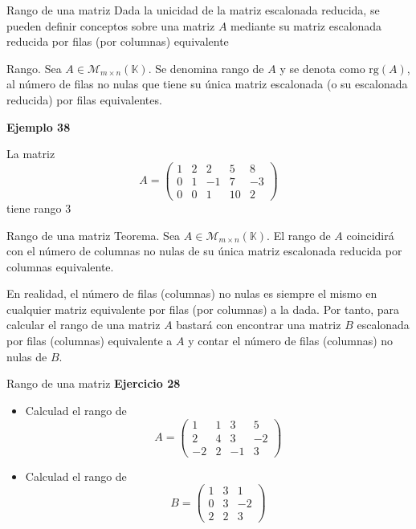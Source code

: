 \documentclass[
  ignorenonframetext,
]{beamer}
\begin{document}
\begin{frame}{Rango de una matriz}
\protect\hypertarget{rango-de-una-matriz-1}{}
Dada la unicidad de la matriz escalonada reducida, se pueden definir
conceptos sobre una matriz \(A\) mediante su matriz escalonada reducida
por filas (por columnas) equivalente

Rango. Sea \(A\in\mathcal{M}_{m\times n}(\mathbb{K})\). Se denomina
rango de \(A\) y se denota como \(\text{rg}(A)\), al número de filas no
nulas que tiene su única matriz escalonada (o su escalonada reducida)
por filas equivalentes.

\textbf{Ejemplo 38}

La matriz
\[A = \begin{pmatrix}1&2&2&5&8\\0&1&-1&7&-3\\0&0&1&10&2\end{pmatrix}\]
tiene rango 3
\end{frame}

\begin{frame}{Rango de una matriz}
\protect\hypertarget{rango-de-una-matriz-2}{}
Teorema. Sea \(A\in\mathcal{M}_{m\times n}(\mathbb{K})\). El rango de
\(A\) coincidirá con el número de columnas no nulas de su única matriz
escalonada reducida por columnas equivalente.

En realidad, el número de filas (columnas) no nulas es siempre el mismo
en cualquier matriz equivalente por filas (por columnas) a la dada. Por
tanto, para calcular el rango de una matriz \(A\) bastará con encontrar
una matriz \(B\) escalonada por filas (columnas) equivalente a \(A\) y
contar el número de filas (columnas) no nulas de \(B\).
\end{frame}

\begin{frame}{Rango de una matriz}
\protect\hypertarget{rango-de-una-matriz-3}{}
\textbf{Ejercicio 28}

\begin{itemize}
\item
  Calculad el rango de
  \[A=\begin{pmatrix}1&1&3&5\\2&4&3&-2\\-2&2&-1&3\end{pmatrix}\]
\item
  Calculad el rango de
  \[B = \begin{pmatrix}1&3&1\\0&3&-2\\2&2&3\end{pmatrix}\]
\end{itemize}
\end{frame}
\end{document}

